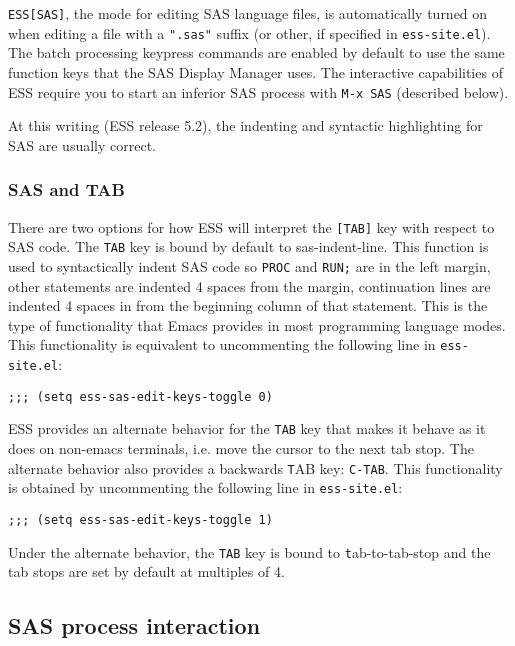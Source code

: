 \documentclass{article}
\begin{document}
\texttt{ESS[SAS]}, the mode for editing SAS language files, is automatically
turned on when editing a file with a \texttt{".sas"} suffix (or other, if
specified in \texttt{ess-site.el}).  The batch processing keypress commands are
enabled by default to use the same function keys that the SAS Display
Manager uses.  The interactive capabilities of ESS require you to
start an inferior SAS process with \texttt{M-x SAS} (described below).

At this writing (ESS release 5.2), the indenting and syntactic
highlighting for SAS are usually correct.


\subsubsection{SAS and TAB}
\label{sec:SAS:tab}

There are two options for how ESS will interpret the \texttt{[TAB]} key
with respect to SAS code.  The \texttt{TAB} key is bound by default to
sas-indent-line.  This function is used to syntactically indent SAS
code so \texttt{PROC} and \texttt{RUN;} are in the left margin, other
statements are indented 4 spaces from the margin, continuation lines
are indented 4 spaces in from the beginning column of that statement.
This is the type of functionality that Emacs provides in most
programming language modes.  This functionality is equivalent to
uncommenting the following line in \texttt{ess-site.el}:
\begin{verbatim}
;;; (setq ess-sas-edit-keys-toggle 0)
\end{verbatim}

ESS provides an alternate behavior for the \texttt{TAB} key that makes it
behave as it does on non-emacs terminals, i.e. move the cursor to the
next tab stop.  The alternate behavior also provides a backwards {\texttt
  TAB} key: \texttt{C-TAB}.  This functionality is obtained by
uncommenting the following line in \texttt{ess-site.el}:
\begin{verbatim}
;;; (setq ess-sas-edit-keys-toggle 1)
\end{verbatim}
Under the alternate behavior, the \texttt{TAB} key is bound to {\texttt
  tab-to-tab-stop} and the tab stops are set by default at multiples
of 4.

\subsection{SAS process interaction}
\label{sec:SAS:proc}
\end{document}
